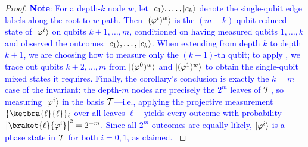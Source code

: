 \begin{proof}
    \textcolor{blue}{\textbf{Note}: For a depth-$k$ node $w$, let $\lvert c_1\rangle, \ldots, \lvert c_k\rangle$ denote the single-qubit edge labels along the root-to-$w$ path. Then $\lvert(\varphi^i)^{w}\rangle$ is the $(m-k)$-qubit reduced state of $\lvert\varphi^i\rangle$ on qubits $k+1, \ldots, m$, conditioned on having measured qubits $1, \ldots, k$ and observed the outcomes $\lvert c_1\rangle, \ldots, \lvert c_k\rangle$. When extending from depth $k$ to depth $k+1$, we are choosing how to measure only the $(k+1)$-th qubit; to apply , we trace out qubits $k+2, \ldots, m$ from $\lvert(\varphi^0)^{w}\rangle$ and $\lvert(\varphi^1)^{w}\rangle$ to obtain the single-qubit mixed states it requires.
    Finally, the corollary's conclusion is exactly the $k = m$ case of the invariant: the depth-$m$ nodes are precisely the $2^m$ leaves of $\mathcal{T}$, so measuring $\lvert\varphi^i\rangle$ in the basis $\mathcal{T}$---i.e., applying the projective measurement $\{\ketbra{\ell}{\ell}\}_{\ell}$ over all leaves $\ell$---yields every outcome with probability $\abs{\braket{\ell}{\phi^i}}^2 = 2^{-m}$. Since all $2^m$ outcomes are equally likely, $\lvert\varphi^i\rangle$ is a phase state in $\mathcal{T}$ for both $i = 0, 1$, as claimed.
    }
\end{proof}


